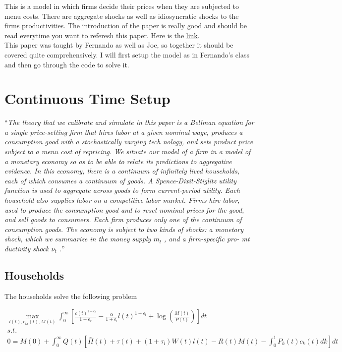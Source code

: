 This is a model in which firms decide their prices when they are subjected to menu costs. There are aggregate shocks as well as idiosyncratic shocks to the firms productivities. The introduction of the paper is really good and should be read everytime you want to referesh this paper. Here is the \href{https://www.jstor.org/stable/pdf/10.1086/512625.pdf?casa_token=RizjOY_F_XwAAAAA:BCyyclp2TThp916QIcim9m915PciFhUa_3nctyOocZTTXWTaCuUhA5i01fCoI3WF7fZ4wntxRfGwKfsJI0NpS3lNyLzxs7hzvctl66z-1rL8p_0lJjM}{link}. \\

This paper was taught by Fernando as well as Joe, so together it should be covered quite comprehensively. I will first setup the model as in Fernando's class and then go through the code to solve it.

\section{Continuous Time Setup}

``\textit{The theory that we calibrate and simulate in this paper is a Bellman
equation for a single price-setting firm that hires labor at a given nominal
wage, produces a consumption good with a stochastically varying tech nology, and sets product price subject to a menu cost of repricing. We
situate our model of a firm in a model of a monetary economy so as
to be able to relate its predictions to aggregative evidence. In this economy, there is a continuum of infinitely lived households, each of which
consumes a continuum of goods. A Spence-Dixit-Stiglitz utility function
is used to aggregate across goods to form current-period utility. Each
household also supplies labor on a competitive labor market. Firms hire
labor, used to produce the consumption good and to reset nominal
prices for the good, and sell goods to consumers. Each firm produces
only one of the continuum of consumption goods. The economy is subject to two kinds of shocks: a monetary shock,
which we summarize in the money supply $m_t$ , and a firm-specific pro- mt
ductivity shock $\nu_t$ .}''

\subsection{Households}

The households solve the following problem

\begin{align}
  \max_{l(t), c_{ki}(t), M(t)} \int_0^{\infty} \left[ \frac{c(t)^{1-\epsilon_c}}{1-\epsilon_c} - \frac{\alpha}{1+\epsilon_l} l(t)^{1+\epsilon_l} + \log \left( \frac{M(t)}{P(t)} \right)\right] dt \\
  s.t. \\
  0 = M(0) + \int_0^{\infty} Q(t) \left[ \bar \Pi(t) + \tau(t) + (1+\tau_l) W(t) l(t) - R(t)M(t) - \int_0^1 P_k(t)c_k(t) dk \right] dt
\end{align}

